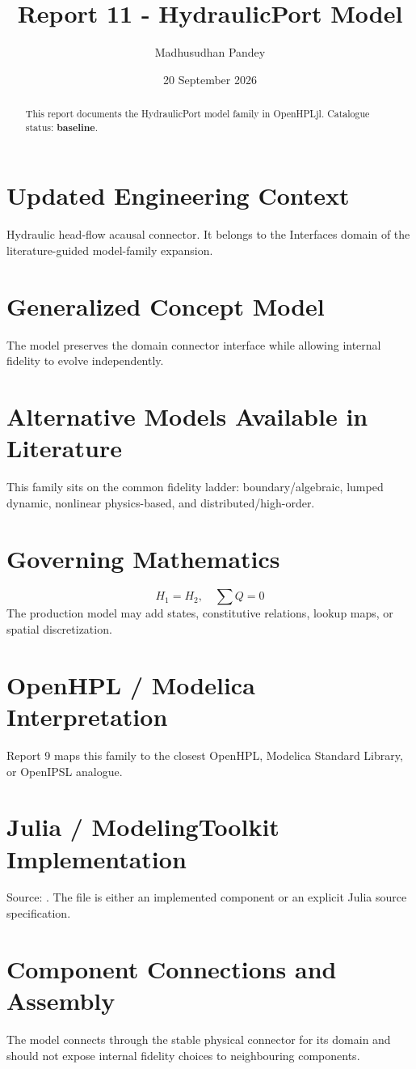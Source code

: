 \documentclass[10pt,a4paper]{article}
\title{Report 11 - HydraulicPort Model}
\author{Madhusudhan Pandey}
\date{20 September 2026}
\begin{document}
\maketitle
\begin{abstract}
This report documents the HydraulicPort model family in OpenHPLjl. Catalogue status: \textbf{baseline}.
\end{abstract}
\section{Updated Engineering Context}
Hydraulic head-flow acausal connector. It belongs to the Interfaces domain of the literature-guided model-family expansion.
\section{Generalized Concept Model}
The model preserves the domain connector interface while allowing internal fidelity to evolve independently.
\section{Alternative Models Available in Literature}
This family sits on the common fidelity ladder: boundary/algebraic, lumped dynamic, nonlinear physics-based, and distributed/high-order.
\section{Governing Mathematics}
\[H_1=H_2,\quad \sum Q=0\]
The production model may add states, constitutive relations, lookup maps, or spatial discretization.
\section{OpenHPL / Modelica Interpretation}
Report 9 maps this family to the closest OpenHPL, Modelica Standard Library, or OpenIPSL analogue.
\section{Julia / ModelingToolkit Implementation}
Source: \texttt{}. The file is either an implemented component or an explicit Julia source specification.
\section{Component Connections and Assembly}
The model connects through the stable physical connector for its domain and should not expose internal fidelity choices to neighbouring components.
\end{document}
